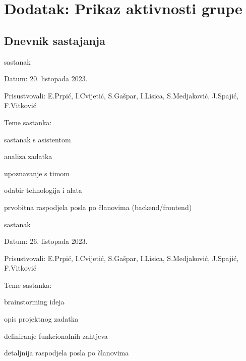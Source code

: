 \chapter*{Dodatak: Prikaz aktivnosti grupe}
		
		\section*{Dnevnik sastajanja}
		
		\begin{packed_enum}
			\item  sastanak
			
			\item[] \begin{packed_item}
				\item Datum: 20. listopada 2023.
				\item Prisustvovali: E.Prpić, I.Cvijetić, S.Gašpar, I.Lisica, S.Medjaković, J.Spajić, F.Vitković
				\item Teme sastanka:
				\begin{packed_item}
					\item  sastanak s asistentom
					\item  analiza zadatka
					\item  upoznavanje s timom
					\item  odabir tehnologija i alata
					\item  prvobitna raspodjela posla po članovima (backend/frontend)
				\end{packed_item}
			\end{packed_item}
			
			\item  sastanak
			\item[] \begin{packed_item}
				\item Datum: 26. listopada 2023.
				\item Prisustvovali: E.Prpić, I.Cvijetić, S.Gašpar, I.Lisica, S.Medjaković, J.Spajić, F.Vitković
				\item Teme sastanka:
				\begin{packed_item}
					\item  brainstorming ideja
					\item  opis projektnog zadatka
					\item  definiranje funkcionalnih zahtjeva
					\item  detaljnija raspodjela posla po članovima
				\end{packed_item}
			\end{packed_item}
			

\end{packed_enum}
